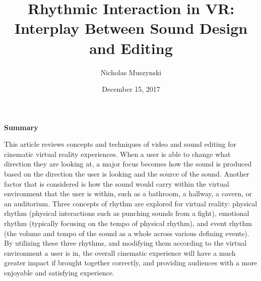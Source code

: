 \documentclass{article}
\begin{document}
\title{Rhythmic Interaction in VR: Interplay Between Sound Design and Editing}
\author{Nicholas Muszynski}
\date{December 15, 2017}

\maketitle

\textbf{Summary}
\newline

This article reviews concepts and techniques of video and sound editing for cinematic virtual reality experiences. When a user is able to change what direction they are looking at, a major focus becomes how the sound is produced based on the direction the user is looking and the source of the sound. Another factor that is considered is how the sound would carry within the virtual environment that the user is within, such as a bathroom, a hallway, a cavern, or an auditorium. Three concepts of rhythm are explored for virtual reality: physical rhythm (physical interactions such as punching sounds from a fight), emotional rhythm (typically focusing on the tempo of physical rhythm), and event rhythm (the volume and tempo of the sound as a whole across various defining events). By utilizing these three rhythms, and modifying them according to the virtual environment a user is in, the overall cinematic experience will have a much greater impact if brought together correctly, and providing audiences with a more enjoyable and satisfying experience.

\nocite{musicCite}



\end{document}
